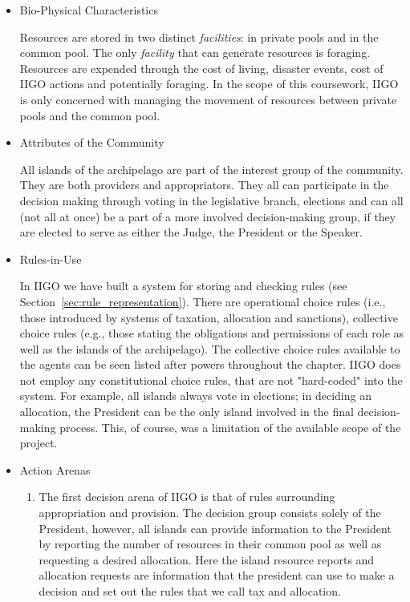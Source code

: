 \begin{itemize}
    \item Bio-Physical Characteristics
    
    Resources are stored in two distinct \emph{facilities}: in private pools and in the common pool. The only \emph{facility} that can generate resources is foraging. Resources are expended through the cost of living, disaster events, cost of IIGO actions and potentially foraging. In the scope of this coursework, IIGO is only concerned with managing the movement of resources between private pools and the common pool. 
    
    \item Attributes of the Community
    
    All islands of the archipelago are part of the interest group of the community. They are both providers and appropriators. They all can participate in the decision making through voting in the legislative branch, elections and can all (not all at once) be a part of a more involved decision-making group, if they are elected to serve as either the Judge, the President or the Speaker. 
    \item Rules-in-Use
    
    In IIGO we have built a system for storing and checking rules (see Section~\ref*{sec:rule_representation}). There are operational choice rules (i.e., those introduced by systems of taxation, allocation and sanctions), collective choice rules (e.g., those stating the obligations and permissions of each role as well as the islands of the archipelago). The collective choice rules available to the agents can be seen listed after powers throughout the chapter. IIGO does not employ any constitutional choice rules, that are not "hard-coded" into the system. For example, all islands always vote in elections; in deciding an allocation, the President can be the only island involved in the final decision-making process. This, of course, was a limitation of the available scope of the project.
    
    \item Action Arenas
    \begin{enumerate}
        \item The first decision arena of IIGO is that of rules surrounding appropriation and provision. The decision group consists solely of the President, however, all islands can provide information to the President by reporting the number of resources in their common pool as well as requesting a desired allocation. Here the island resource reports and allocation requests are information that the president can use to make a decision and set out the rules that we call tax and allocation. 
        

\end{enumerate}
\end{itemize}

